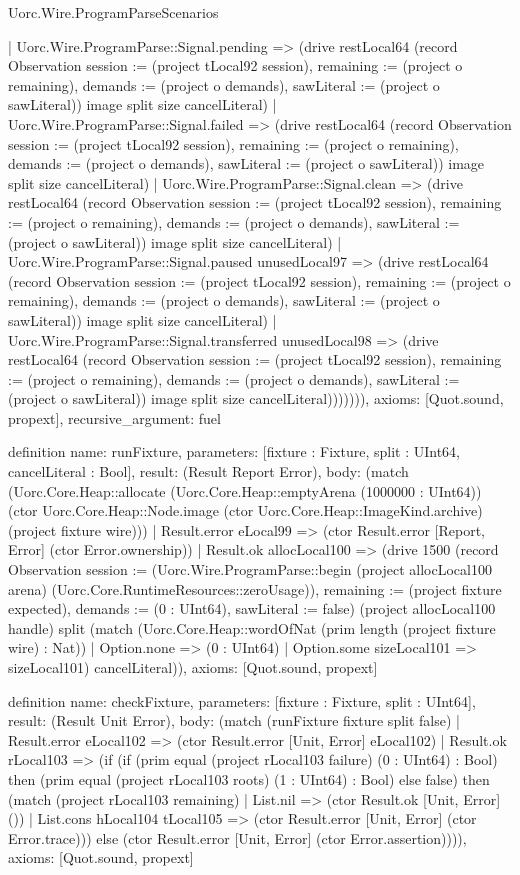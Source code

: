 \begin{lexlean}{Uorc.Wire.ProgramParseScenarios}
\begin{semanticmodule}
{          | Uorc.Wire.ProgramParse::Signal.pending => (drive restLocal64 (record Observation {session := (project tLocal92 session), remaining := (project o remaining), demands := (project o demands), sawLiteral := (project o sawLiteral)}) image split size cancelLiteral)
          | Uorc.Wire.ProgramParse::Signal.failed => (drive restLocal64 (record Observation {session := (project tLocal92 session), remaining := (project o remaining), demands := (project o demands), sawLiteral := (project o sawLiteral)}) image split size cancelLiteral)
          | Uorc.Wire.ProgramParse::Signal.clean => (drive restLocal64 (record Observation {session := (project tLocal92 session), remaining := (project o remaining), demands := (project o demands), sawLiteral := (project o sawLiteral)}) image split size cancelLiteral)
          | Uorc.Wire.ProgramParse::Signal.paused unusedLocal97 => (drive restLocal64 (record Observation {session := (project tLocal92 session), remaining := (project o remaining), demands := (project o demands), sawLiteral := (project o sawLiteral)}) image split size cancelLiteral)
          | Uorc.Wire.ProgramParse::Signal.transferred unusedLocal98 => (drive restLocal64 (record Observation {session := (project tLocal92 session), remaining := (project o remaining), demands := (project o demands), sawLiteral := (project o sawLiteral)}) image split size cancelLiteral))))))),
  axioms: [Quot.sound, propext],
  recursive_argument: fuel
}

definition{
  name: runFixture,
  parameters: [fixture : Fixture, split : UInt64, cancelLiteral : Bool],
  result: (Result Report Error),
  body: (match (Uorc.Core.Heap::allocate (Uorc.Core.Heap::emptyArena (1000000 : UInt64)) (ctor Uorc.Core.Heap::Node.image (ctor Uorc.Core.Heap::ImageKind.archive) (project fixture wire)))
    | Result.error eLocal99 => (ctor Result.error [Report, Error] (ctor Error.ownership))
    | Result.ok allocLocal100 => (drive 1500 (record Observation {session := (Uorc.Wire.ProgramParse::begin (project allocLocal100 arena) (Uorc.Core.RuntimeResources::zeroUsage)), remaining := (project fixture expected), demands := (0 : UInt64), sawLiteral := false}) (project allocLocal100 handle) split (match (Uorc.Core.Heap::wordOfNat (prim length (project fixture wire) : Nat))
      | Option.none => (0 : UInt64)
      | Option.some sizeLocal101 => sizeLocal101) cancelLiteral)),
  axioms: [Quot.sound, propext]
}

definition{
  name: checkFixture,
  parameters: [fixture : Fixture, split : UInt64],
  result: (Result Unit Error),
  body: (match (runFixture fixture split false)
    | Result.error eLocal102 => (ctor Result.error [Unit, Error] eLocal102)
    | Result.ok rLocal103 => (if (if (prim equal (project rLocal103 failure) (0 : UInt64) : Bool) then (prim equal (project rLocal103 roots) (1 : UInt64) : Bool) else false) then (match (project rLocal103 remaining)
      | List.nil => (ctor Result.ok [Unit, Error] ())
      | List.cons hLocal104 tLocal105 => (ctor Result.error [Unit, Error] (ctor Error.trace))) else (ctor Result.error [Unit, Error] (ctor Error.assertion)))),
  axioms: [Quot.sound, propext]
}


\end{semanticmodule}
\end{lexlean}
